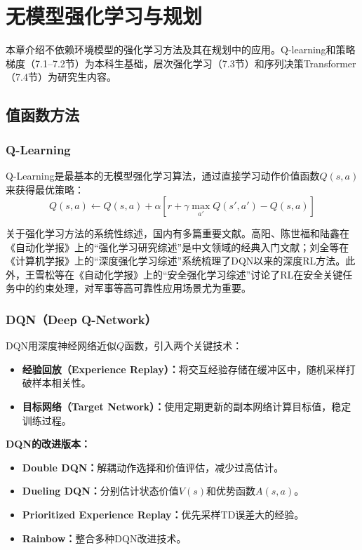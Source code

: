 \chapter{无模型强化学习与规划}

\begin{levelbox}
本章介绍不依赖环境模型的强化学习方法及其在规划中的应用。Q-learning和策略梯度（7.1--7.2节）为本科生基础，层次强化学习（7.3节）和序列决策Transformer（7.4节）为研究生内容。
\end{levelbox}

\section{值函数方法 \ug}

\subsection{Q-Learning}

Q-Learning是最基本的无模型强化学习算法，通过直接学习动作价值函数$Q(s,a)$来获得最优策略：
$$Q(s,a) \leftarrow Q(s,a) + \alpha \left[ r + \gamma \max_{a'} Q(s', a') - Q(s,a) \right]$$

\begin{remark}
关于强化学习方法的系统性综述，国内有多篇重要文献。高阳、陈世福和陆鑫在《自动化学报》上的``强化学习研究综述''是中文领域的经典入门文献；刘全等在《计算机学报》上的``深度强化学习综述''系统梳理了DQN以来的深度RL方法。此外，王雪松等在《自动化学报》上的``安全强化学习综述''讨论了RL在安全关键任务中的约束处理，对军事等高可靠性应用场景尤为重要。
\end{remark}

\subsection{DQN（Deep Q-Network） \ug}

DQN用深度神经网络近似$Q$函数，引入两个关键技术：
\begin{itemize}
  \item \textbf{经验回放（Experience Replay）：}将交互经验存储在缓冲区中，随机采样打破样本相关性。
  \item \textbf{目标网络（Target Network）：}使用定期更新的副本网络计算目标值，稳定训练过程。
\end{itemize}

\textbf{DQN的改进版本：}
\begin{itemize}
  \item \textbf{Double DQN：}解耦动作选择和价值评估，减少过高估计。
  \item \textbf{Dueling DQN：}分别估计状态价值$V(s)$和优势函数$A(s,a)$。
  \item \textbf{Prioritized Experience Replay：}优先采样TD误差大的经验。
  \item \textbf{Rainbow：}整合多种DQN改进技术。
\end{itemize}

